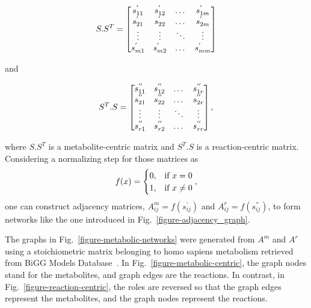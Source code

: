 \noindent\begin{minipage}{.5\linewidth}
	\begin{equation}
		S.S^{T} =  \begin{bmatrix}
			s^{'}_{11} & s^{'}_{12} & \dots  & s^{'}_{1m}\\
			s^{'}_{21} & s^{'}_{22} & \dots  & s^{'}_{2m}\\
			\vdots & \vdots &\ddots & \vdots \\
			s^{'}_{m1} & s^{'}_{m2} & \dots & s^{'}_{mm} 
		\end{bmatrix}
		\notag
	\end{equation}
\end{minipage} and
\begin{minipage}{.5\linewidth}
	\begin{equation}
		S^{T}.S =  \begin{bmatrix}
			s^{''}_{11} & s^{''}_{12} & \dots  & s^{''}_{1r}\\
			s^{''}_{21} & s^{''}_{22} & \dots  & s^{''}_{2r}\\
			\vdots & \vdots &\ddots & \vdots \\
			s^{''}_{r1} & s^{''}_{r2} & \dots & s^{''}_{rr} 
		\end{bmatrix},
		\notag
	\end{equation}
\end{minipage}

where $S.S^{T}$ is a metabolite-centric matrix and $S^{T}.S$ is a reaction-centric matrix. Considering a normalizing step for those matrices as 
\begin{equation}
	f(x) =
	\begin{cases}
		0, & \text{if}\ x = 0 \\
		1, & \text{if}\ x \neq 0
	\end{cases},
	\notag
\end{equation}
one can construct adjacency matrices, $A^{m}_{ij}=f(s^{'}_{ij})$ and $A^{r}_{ij}=f(s^{''}_{ij})$, to form networks like the one introduced in Fig.~\ref{figure-adjacency_graph}. 

The graphs in Fig.~\ref{figure-metabolic-networks} were generated from $A^{m}$ and $A^{r}$ using a stoichiometric matrix belonging to homo sapiens metabolism retrieved from BiGG Models Database~\cite{biggmodels}. In Fig.~\ref{figure-metabolic-centric}, the graph nodes stand for the metabolites, and graph edges are the reactions. In contrast, in Fig.~\ref{figure-reaction-centric}, the roles are reversed so that the graph edges represent the metabolites, and the graph nodes represent the reactions.


